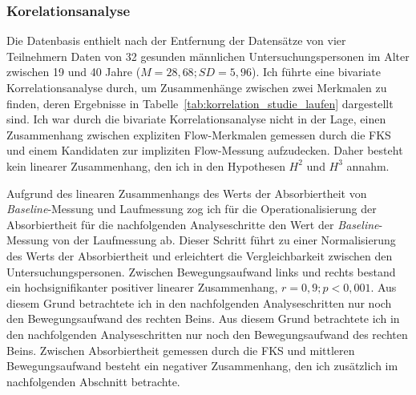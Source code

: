 \subsubsection{Korelationsanalyse}
Die Datenbasis enthielt nach der Entfernung der Datensätze von vier Teilnehmern Daten von 32 gesunden männlichen Untersuchungspersonen im Alter zwischen 19 und 40 Jahre ($M = 28{,}68; SD = 5{,}96$). Ich führte eine bivariate Korrelationsanalyse durch, um Zusammenhänge zwischen zwei Merkmalen zu finden, deren Ergebnisse in Tabelle~\ref{tab:korrelation_studie_laufen} dargestellt sind. Ich war durch die bivariate Korrelationsanalyse nicht in der Lage, einen Zusammenhang zwischen expliziten Flow-Merkmalen gemessen durch die \ac{FKS} und einem Kandidaten zur impliziten Flow-Messung aufzudecken. Daher besteht kein linearer Zusammenhang, den ich in den Hypothesen $H^2$ und $H^3$ annahm.

Aufgrund des linearen Zusammenhangs des Werts der Absorbiertheit von \emph{Baseline}-Messung und Laufmessung zog ich für die Operationalisierung der Absorbiertheit für die nachfolgenden Analyseschritte den Wert der \emph{Baseline}-Messung von der Laufmessung ab. Dieser Schritt führt zu einer Normalisierung des Werts der Absorbiertheit und erleichtert die Vergleichbarkeit zwischen den Untersuchungspersonen. Zwischen Bewegungsaufwand links und rechts bestand ein hochsignifikanter positiver linearer Zusammenhang, $r = 0{,}9; p < 0{,}001$. Aus diesem Grund betrachtete ich in den nachfolgenden Analyseschritten nur noch den Bewegungsaufwand des rechten Beins. Aus diesem Grund betrachtete ich in den nachfolgenden Analyseschritten nur noch den Bewegungsaufwand des rechten Beins. Zwischen Absorbiertheit gemessen durch die \ac{FKS} und mittleren Bewegungsaufwand besteht ein negativer Zusammenhang, den ich zusätzlich im nachfolgenden Abschnitt betrachte.

